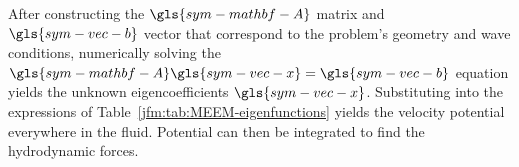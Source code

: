 \documentclass[lineno]{JFM-FLM_Au}
\begin{document}
After constructing the $\gls{sym-mathbf-A}$ matrix and $\gls{sym-vec-b}$ vector 
that correspond to the problem's geometry and wave conditions, 
numerically solving the $\gls{sym-mathbf-A} \gls{sym-vec-x}=\gls{sym-vec-b}$ 
equation yields the unknown eigencoefficients $\gls{sym-vec-x}$.
Substituting into the expressions of Table~\ref{jfm:tab:MEEM-eigenfunctions} 
yields the velocity potential everywhere in the fluid.
Potential can then be integrated to find the hydrodynamic forces.
\end{document}
